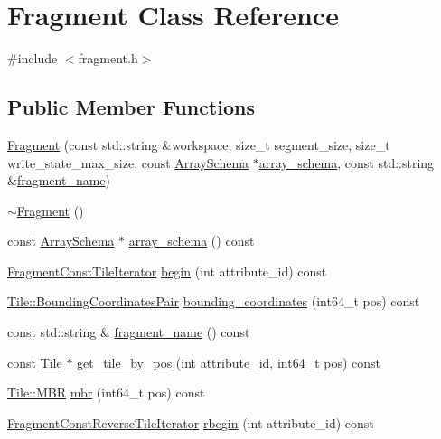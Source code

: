 \hypertarget{classFragment}{}\section{Fragment Class Reference}
\label{classFragment}


{\ttfamily \#include $<$fragment.\+h$>$}

\subsection*{Public Member Functions}
\begin{DoxyCompactItemize}
\item 
\hyperlink{classFragment_aafae2c66e15168f08667e535d89005d9}{Fragment} (const std\+::string \&workspace, size\+\_\+t segment\+\_\+size, size\+\_\+t write\+\_\+state\+\_\+max\+\_\+size, const \hyperlink{classArraySchema}{Array\+Schema} $\ast$\hyperlink{classFragment_a72c53f5a7f20526e0f098d6085aed360}{array\+\_\+schema}, const std\+::string \&\hyperlink{classFragment_afc7a7122531b6311bf23db1f7cbe50a6}{fragment\+\_\+name})
\item 
\hyperlink{classFragment_afafef6f55cd0df3527e50d6ce01a182a}{$\sim$\+Fragment} ()
\item 
const \hyperlink{classArraySchema}{Array\+Schema} $\ast$ \hyperlink{classFragment_a72c53f5a7f20526e0f098d6085aed360}{array\+\_\+schema} () const 
\item 
\hyperlink{classFragmentConstTileIterator}{Fragment\+Const\+Tile\+Iterator} \hyperlink{classFragment_a0a0b8df7b80bbeac465d3ac41a7851f6}{begin} (int attribute\+\_\+id) const 
\item 
\hyperlink{classTile_a7103069b7ba05d1032733e3a026b8632}{Tile\+::\+Bounding\+Coordinates\+Pair} \hyperlink{classFragment_ac21bea21689b09ade1c6c0c89740dbe9}{bounding\+\_\+coordinates} (int64\+\_\+t pos) const 
\item 
const std\+::string \& \hyperlink{classFragment_afc7a7122531b6311bf23db1f7cbe50a6}{fragment\+\_\+name} () const 
\item 
const \hyperlink{classTile}{Tile} $\ast$ \hyperlink{classFragment_abccf1fe726b7f232b7e9590f8524e8d8}{get\+\_\+tile\+\_\+by\+\_\+pos} (int attribute\+\_\+id, int64\+\_\+t pos) const 
\item 
\hyperlink{classTile_a0b0f911c937d339ce110c18a2d015a4d}{Tile\+::\+M\+B\+R} \hyperlink{classFragment_a5de3cb81d82b4b577f0fa57d06003188}{mbr} (int64\+\_\+t pos) const 
\item 
\hyperlink{classFragmentConstReverseTileIterator}{Fragment\+Const\+Reverse\+Tile\+Iterator} \hyperlink{classFragment_a4665dfa29c15ce8584b39d99409fa579}{rbegin} (int attribute\+\_\+id) const 

\end{DoxyCompactItemize}
